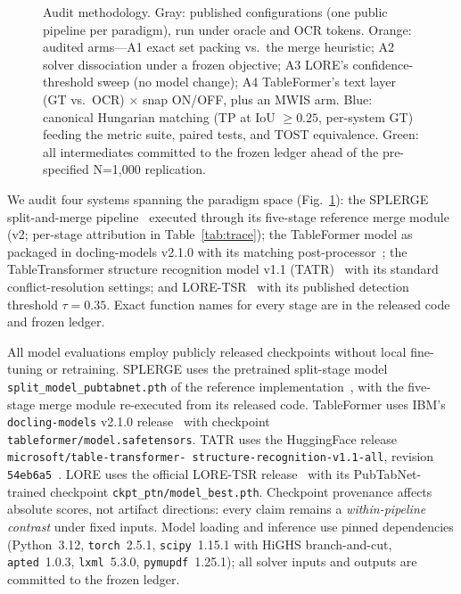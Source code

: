\documentclass[final,5p,times,twocolumn]{elsarticle}
\begin{document}
\begin{figure}[t]
{}%
\caption{Audit methodology. Gray: published configurations (one public
pipeline per paradigm), run under oracle and OCR tokens. Orange: audited
arms---A1 exact set packing vs.\ the merge heuristic; A2 solver dissociation
under a frozen objective; A3 LORE's confidence-threshold sweep (no model
change); A4 TableFormer's text layer (GT vs.\ OCR) $\times$ snap ON/OFF, plus
an MWIS arm. Blue: canonical Hungarian matching (TP at IoU $\geq 0.25$,
per-system GT) feeding the metric suite, paired tests, and TOST equivalence.
Green: all intermediates committed to the frozen ledger ahead of the
pre-specified N=1{,}000 replication.}
\label{fig:method}
\end{figure}

We audit four systems spanning the paradigm space (Fig.~\ref{fig:method}): the SPLERGE
split-and-merge pipeline~\cite{tensmeyer2019} executed through its five-stage
reference merge module (v2; per-stage attribution in
Table~\ref{tab:trace}); the
TableFormer model as packaged in docling-models v2.1.0 with its matching
post-processor~\cite{nassar2022tableformer,auer2024docling}; the
TableTransformer structure recognition model v1.1 (TATR)~\cite{smock2022pubtables1m}
with its standard conflict-resolution settings; and
LORE-TSR~\cite{xing2023lore} with its published detection threshold
$\tau{=}0.35$. Exact function names for every stage are in the released code
and frozen ledger.

All model evaluations employ publicly released checkpoints without local
fine-tuning or retraining. SPLERGE uses the pretrained split-stage model
\texttt{split\_model\_\allowbreak pubtabnet.pth} of the reference
implementation~\cite{tensmeyer2019}, with the five-stage merge module
re-executed from its released code. TableFormer uses IBM's
\texttt{docling-models} v2.1.0 release~\cite{auer2024docling} with checkpoint
\texttt{tableformer/\allowbreak model.safetensors}. TATR uses the HuggingFace release
\texttt{microsoft/\allowbreak table-\allowbreak transformer-\allowbreak
structure-\allowbreak recognition-\allowbreak v1.1-all}, revision
\texttt{54eb6a5}~\cite{smock2022pubtables1m}. LORE uses the official
LORE-TSR release~\cite{xing2023lore} with its PubTabNet-trained checkpoint
\texttt{ckpt\_ptn/\allowbreak model\_best.pth}.
Checkpoint provenance affects absolute scores, not artifact directions:
every claim remains a \emph{within-pipeline contrast} under fixed inputs. Model loading and inference
use pinned dependencies (Python~3.12, \texttt{torch}~2.5.1, \texttt{scipy}~1.15.1
with HiGHS branch-and-cut, \texttt{apted}~1.0.3, \texttt{lxml}~5.3.0,
\texttt{pymupdf}~1.25.1); all solver inputs and outputs are committed to the
frozen ledger.
\end{document}
